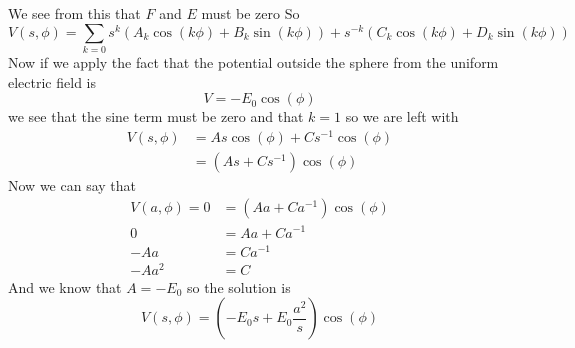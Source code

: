 \documentclass[11pt]{article}
\numberwithin{equation}{section}
\begin{document}
We see from this that $F$ and $E$ must be zero So 
$$V(s,\phi) = \sum_{k=0}s^k(A_k\cos(k\phi) + B_k\sin(k\phi))+s^{-k}(C_k\cos(k\phi) + D_k\sin(k\phi))$$
Now if we apply the fact that the potential outside the sphere from the uniform electric field is $$V = -E_0\cos(\phi)$$
we see that the sine term must be zero and that $k=1$ so we are left with
\begin{align*}
V(s,\phi) &= As\cos(\phi)+Cs^{-1}\cos(\phi)\\
&= (As+Cs^{-1})\cos(\phi)
\end{align*}
Now we can say that
\begin{align*}
V(a,\phi) = 0 &= (Aa+Ca^{-1})\cos(\phi)\\
0 &= Aa+Ca^{-1}\\
-Aa &= Ca^{-1}\\
-Aa^2 &= C
\end{align*}
And we know that $A=-E_0$ so the solution is
$$V(s,\phi) = \left(-E_0s+E_0\frac{a^2}{s}\right)\cos(\phi)$$
\end{document}
